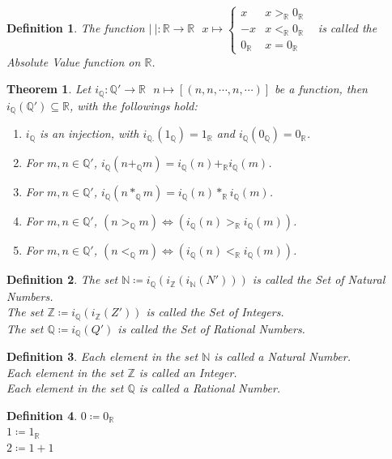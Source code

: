 \documentclass[11pt]{article}
\theoremstyle{break}
\theoremstyle{break}
\newtheorem{thm}{Theorem}[section]
\newtheorem{defn}{Definition}[corL]
\newcommand{\R}{\mathbb{R}}
\newcommand{\N}{\mathbb{N}}
\newcommand{\Z}{\mathbb{Z}}
\newcommand{\Q}{\mathbb{Q}}
\begin{document}
	\begin{defn}
		The function $| \ |: \R \to \R \ \ \ x \mapsto \begin{cases} x & x >_{\R} 0_{\R} \\ -x & x<_{\R} 0_{\R} \\ 0_\R & x=0_{\R} \end{cases}$ \ is called the Absolute Value function on $\R$.
	\end{defn}
	
	\begin{thm}
		Let $i_{\Q}:\Q' \to \R \ \ \ n \mapsto [(n,n,\cdots,n,\cdots)]$ be a function, then $i_{\Q}(\Q') \subseteq \R$, with the followings hold:
		\begin{enumerate}[topsep=3pt,itemsep=-1ex,partopsep=1ex,parsep=1ex]
			\item $i_{\Q}$ is an injection, with $i_{\Q.}(1_{\Q})=1_{\R}$ and $i_{\Q}(0_{\Q})=0_{\R}$.
			\item For $m,n \in \Q'$, $i_{\Q}(n +_{\Q} m) = i_{\Q}(n) +_{\R} i_{\Q}(m)$.
			\item For $m,n \in \Q'$, $i_{\Q}(n \ast_{\Q} m) = i_{\Q}(n) \ast_{\R} i_{\Q}(m)$.
			\item For $m,n \in \Q'$, $(n >_{\Q} m)\iff(i_{\Q}(n) >_{\R} i_{\Q}(m))$.
			\item For $m,n \in \Q'$, $(n <_{\Q} m)\iff(i_{\Q}(n) <_{\R} i_{\Q}(m))$.
		\end{enumerate}
	\end{thm}
	
	\begin{defn}
		The set $\N \coloneqq i_\Q ( i_\Z ( i_\N ( N' )))$ is called the Set of Natural Numbers.\\
		The set $\Z \coloneqq i_\Q ( i_\Z ( Z' ))$ is called the Set of Integers.\\
		The set $\Q \coloneqq i_\Q ( Q' )$ is called the Set of Rational Numbers.
	\end{defn}
	
	\begin{defn}
		Each element in the set $\N$ is called a Natural Number.\\
		Each element in the set $\Z$ is called an Integer.\\
		Each element in the set $\Q$ is called a Rational Number.
	\end{defn}
	
	\begin{defn}
		$0 \coloneqq 0_\R$\\ $1 \coloneqq 1_\R$\\ $2 \coloneqq 1+1$
	\end{defn}		
				
\end{document}
